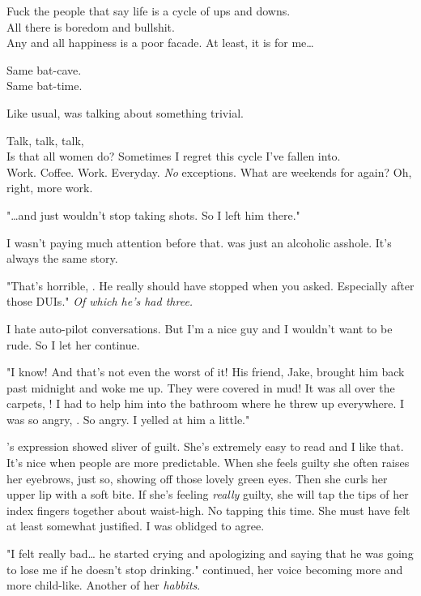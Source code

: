 \noindent
Fuck the people that say life is a cycle of ups and downs. \\
All there is boredom and bullshit. \\
Any and all happiness is a poor facade.  At least, it is for me\ldots
\VV


\VV


\noindent
Same bat-cave.
\\
Same bat-time.
\VV


\noindent
Like usual, \april{} was talking about something trivial.
\VV


\noindent
Talk, talk, talk,
\\
Is that all women do?
Sometimes I regret this cycle I've fallen into.
\\
Work.  Coffee.  Work. Everyday. \textit{No} exceptions.
What are weekends for again?  Oh, right, more work.
\VV

"\ldots{}and \eric{} just wouldn't stop taking shots.  So I left him there."
\VV


\noindent
I wasn't paying much attention before that.
\eric{} was just an alcoholic asshole.  It's always the same story.
\VV


"That's horrible, \april.  He really should have stopped when you asked.
Especially after those DUIs." \textit{Of which he's had three.}
\VV


\noindent
I hate auto-pilot conversations.
But I'm a nice guy and I wouldn't want to be rude.
So I let her continue.
\VV


"I know! And that's not even the worst of it!
His friend, Jake, brought him back past midnight and woke me up.
They were covered in mud!  It was all over the carpets, \josh!
I had to help him into the bathroom where he threw up everywhere.
I was so angry, \josh.  So angry.  I yelled at him a little."
\VV


\noindent
\april's expression showed sliver of guilt.
She's extremely easy to read and I like that.
It's nice when people are more predictable.
When she feels guilty she often raises her eyebrows, just so, showing off
those lovely green eyes.  Then she curls her upper lip with a soft bite.
If she's feeling \textit{really} guilty, she will tap the tips of her
index fingers together about waist-high.
No tapping this time.  She must have felt at least somewhat justified.
I was oblidged to agree.
\VV


"I felt really bad\ldots{} he started crying and apologizing and saying that he
was going to lose me if he doesn't stop drinking."
\april{} continued, her voice becoming more and more child-like.
Another of her \textit{habbits}.
\VV


